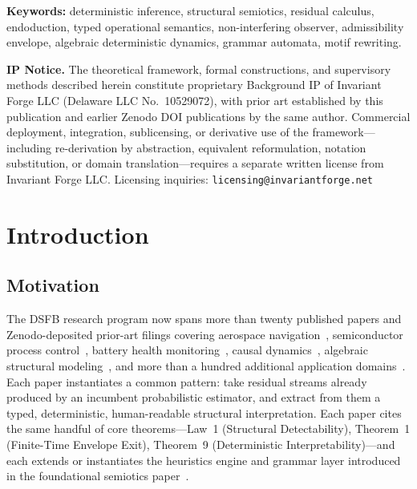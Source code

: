 \documentclass[11pt,a4paper]{article}
\theoremstyle{plain}
\theoremstyle{definition}
\theoremstyle{remark}
\begin{document}
\textbf{Keywords:} deterministic inference, structural semiotics, residual calculus, endoduction,
typed operational semantics, non-interfering observer, admissibility envelope, algebraic
deterministic dynamics, grammar automata, motif rewriting.

\begin{noticebox}
\textbf{IP Notice.} The theoretical framework, formal constructions, and supervisory methods
described herein constitute proprietary Background IP of Invariant Forge LLC (Delaware LLC
No.~10529072), with prior art established by this publication and earlier Zenodo DOI publications
by the same author. Commercial deployment, integration, sublicensing, or derivative use of the
framework---including re-derivation by abstraction, equivalent reformulation, notation substitution,
or domain translation---requires a separate written license from Invariant Forge LLC.
Licensing inquiries: \texttt{licensing@invariantforge.net}
\end{noticebox}

\tableofcontents
\newpage

\section{Introduction}
\label{sec:intro}

\subsection{Motivation}

The DSFB research program now spans more than twenty published papers and Zenodo-deposited
prior-art filings covering aerospace navigation~\cite{dsfb_nav}, semiconductor process
control~\cite{dsfb_semi}, battery health monitoring~\cite{dsfb_battery}, causal dynamics~\cite{dscd},
algebraic structural modeling~\cite{add}, and more than a hundred additional application
domains~\cite{dsfb_survey}. Each paper instantiates a common pattern: take residual streams
already produced by an incumbent probabilistic estimator, and extract from them a typed,
deterministic, human-readable structural interpretation. Each paper cites the same handful of
core theorems---Law~1 (Structural Detectability), Theorem~1 (Finite-Time Envelope Exit),
Theorem~9 (Deterministic Interpretability)---and each extends or instantiates the heuristics
engine and grammar layer introduced in the foundational semiotics paper~\cite{dsfb_semiotics}.
\end{document}
